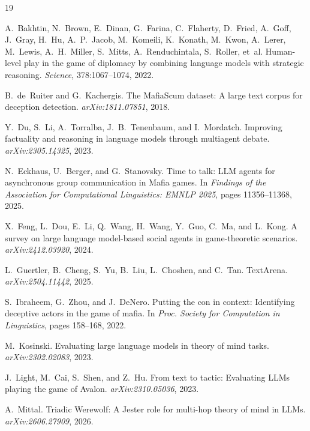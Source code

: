 \documentclass{article}
\begin{document}

\begin{thebibliography}{19}

 A.~Bakhtin, N.~Brown, E.~Dinan, G.~Farina, C.~Flaherty, D.~Fried, A.~Goff, J.~Gray, H.~Hu, A.~P.~Jacob, M.~Komeili, K.~Konath, M.~Kwon, A.~Lerer, M.~Lewis, A.~H.~Miller, S.~Mitts, A.~Renduchintala, S.~Roller, et~al. Human-level play in the game of diplomacy by combining language models with strategic reasoning. \textit{Science}, 378:1067--1074, 2022.

 B.~de~Ruiter and G.~Kachergis. The MafiaScum dataset: A large text corpus for deception detection. \textit{arXiv:1811.07851}, 2018.

 Y.~Du, S.~Li, A.~Torralba, J.~B.~Tenenbaum, and I.~Mordatch. Improving factuality and reasoning in language models through multiagent debate. \textit{arXiv:2305.14325}, 2023.

 N.~Eckhaus, U.~Berger, and G.~Stanovsky. Time to talk: LLM agents for asynchronous group communication in Mafia games. In \textit{Findings of the Association for Computational Linguistics: EMNLP 2025}, pages 11356--11368, 2025.

 X.~Feng, L.~Dou, E.~Li, Q.~Wang, H.~Wang, Y.~Guo, C.~Ma, and L.~Kong. A survey on large language model-based social agents in game-theoretic scenarios. \textit{arXiv:2412.03920}, 2024.

 L.~Guertler, B.~Cheng, S.~Yu, B.~Liu, L.~Choshen, and C.~Tan. TextArena. \textit{arXiv:2504.11442}, 2025.

 S.~Ibraheem, G.~Zhou, and J.~DeNero. Putting the con in context: Identifying deceptive actors in the game of mafia. In \textit{Proc. Society for Computation in Linguistics}, pages 158--168, 2022.

 M.~Kosinski. Evaluating large language models in theory of mind tasks. \textit{arXiv:2302.02083}, 2023.

 J.~Light, M.~Cai, S.~Shen, and Z.~Hu. From text to tactic: Evaluating LLMs playing the game of Avalon. \textit{arXiv:2310.05036}, 2023.

 A.~Mittal. Triadic Werewolf: A Jester role for multi-hop theory of mind in LLMs. \textit{arXiv:2606.27909}, 2026.


\end{thebibliography}
\end{document}

